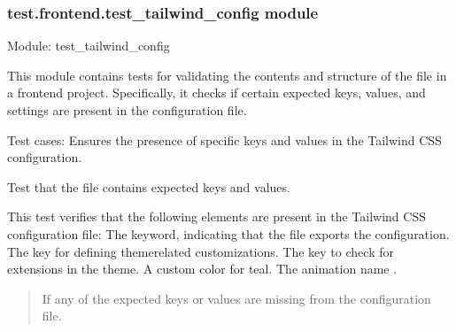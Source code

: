 \documentclass[letterpaper,10pt,english]{sphinxmanual}
\begin{document}
\subsubsection{test.frontend.test\_tailwind\_config module}
\label{\detokenize{test.frontend:module-test.frontend.test_tailwind_config}}\label{\detokenize{test.frontend:test-frontend-test-tailwind-config-module}}
\sphinxAtStartPar
Module: test\_tailwind\_config

\sphinxAtStartPar
This module contains tests for validating the contents and structure of the 
file in a frontend project. Specifically, it checks if certain expected keys, values, and settings
are present in the configuration file.

\sphinxAtStartPar
Test cases:
\sphinxhyphen{} Ensures the presence of specific keys and values in the Tailwind CSS configuration.

\begin{fulllineitems}
\label{\detokenize{test.frontend:test.frontend.test_tailwind_config.test_tailwind_config_contains_expected_keys}}
\pysigstartsignatures
\pysiglinewithargsret
{}
{}
{}
\pysigstopsignatures
\sphinxAtStartPar
Test that the  file contains expected keys and values.

\sphinxAtStartPar
This test verifies that the following elements are present in the Tailwind CSS configuration file:
\sphinxhyphen{} The  keyword, indicating that the file exports the configuration.
\sphinxhyphen{} The  key for defining theme\sphinxhyphen{}related customizations.
\sphinxhyphen{} The  key to check for extensions in the theme.
\sphinxhyphen{} A custom color  for teal.
\sphinxhyphen{} The animation name .
\begin{quote}\begin{description}
\sphinxAtStartPar
{} \textendash{} If any of the expected keys or values are missing from the configuration file.

\end{description}\end{quote}

\end{fulllineitems}
\end{document}
